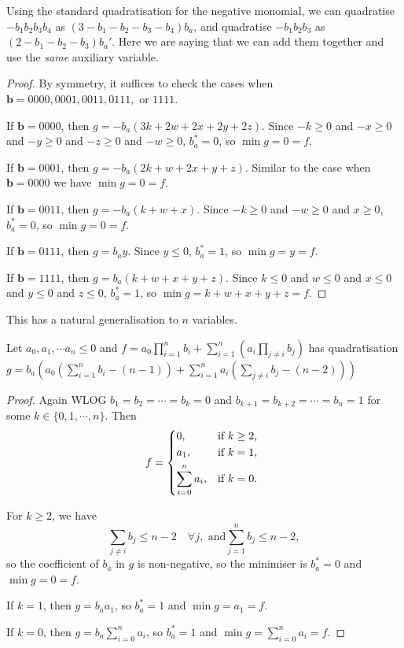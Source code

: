 \documentclass[11pt]{scrartcl}
\newcommand{\vc}[1]{\boldsymbol{#1}}
\begin{document}
\begin{remark}
	Using the standard quadratisation for the negative monomial, we can quadratise $ -b_1b_2b_3b_4 $ as $(3-b_1-b_2-b_3-b_4)b_a$, and quadratise
	$-b_1b_2b_3$ as $(2-b_1-b_2-b_3)b_a'$. Here we are saying that we can add them together and use the \textit{same} auxiliary variable.
\end{remark}

\begin{proof}
By symmetry, it suffices to check the cases when $\vc b = 0000, 0001, 0011, 0111, $ or $1111$.

If $\vc b = 0000$, then $g = -b_a(3k + 2w + 2x + 2y + 2z)$. Since $-k \ge 0$ and $-x \ge 0$ and $-y \ge 0$ and $-z \ge 0$ and $-w \ge 0$, $b_a^* = 0$, so $\min g = 0 = f$.

If $\vc b = 0001$, then $g = -b_a(2k + w + 2x + y + z)$. Similar to the case when $\vc b = 0000$ we have $\min g = 0 = f$.

If $\vc b = 0011$, then $g = -b_a(k + w + x)$. Since $-k \ge 0$ and $-w \ge 0$ and $x \ge 0$, $b_a^* = 0$, so $\min g = 0 = f$.

If $\vc b = 0111$, then $g = b_ay$. Since $y \le 0$, $b_a^* = 1$, so $\min g = y = f$.

If $\vc b = 1111$, then $g = b_a(k + w + x + y + z)$. Since $k \le 0$ and $w \le 0$ and $x \le 0$ and $y \le 0$ and $z \le 0$, $b_a^* = 1$, so $\min g = k + w + x + y + z  = f$.

\end{proof}

This has a natural generalisation to $n$ variables.

\begin{theorem}
	Let $a_0, a_1, \cdots a_n \le 0$ and $f = a_0 \prod_{i = 1}^n b_i + \sum_{i = 1}^n \left( a_i \prod_{j \neq i} b_j\right)$ has quadratisation $g = b_a \left(a_0\left(\sum_{i=1}^n b_i - (n-1)\right) + \sum_{i=1}^n a_i \left( \sum_{j \neq i} b_j - (n-2)\right) \right) $
\end{theorem}

\begin{proof}
	Again WLOG $b_1 = b_2 = \cdots = b_k = 0$ and $b_{k+1} = b_{k+2} = \cdots = b_n = 1$ for some $k \in \{0, 1, \cdots, n\}$.
	Then \[
 f = \begin{dcases*}
        0,  & if $k \ge 2$,\\
        a_1, & if $k = 1$,\\
	\sum_{i=0}^n a_i, & if $k = 0$.
        \end{dcases*}
\]

For $k \ge 2$, we have \[
	\sum_{j\neq i } b_j \le n-2 \quad \forall j, \text{ and} \sum_{j = 1}^n b_j \le n-2,
\]
so the coefficient of $b_a$ in $g$ is non-negative, so the minimiser is $b_a^* = 0$ and $\min g = 0 = f$.

If $k = 1$, then $g = b_a a_1$, so $b_a^* = 1$ and $\min g = a_1 = f$.

If $k = 0$, then $g = b_a \sum_{i=0}^n a_i$, so $b_a^* = 1$ and $\min g = \sum_{i=0}^n a_i = f$.

\end{proof}
\end{document}
